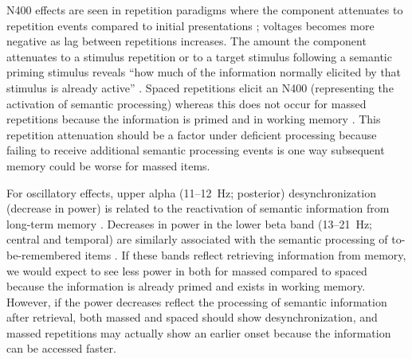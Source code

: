 N400 effects are seen in repetition paradigms where the component attenuates to repetition events compared to initial presentations \cite{KimEtal2001,OlicEtal2000,VanSEtal2007}; voltages becomes more negative as lag between repetitions increases.  The amount the component attenuates to a stimulus repetition or to a target stimulus following a semantic priming stimulus reveals ``how much of the information normally elicited by that stimulus is already active'' \cite[p.~23]{KutaFede2011}.  Spaced repetitions elicit an N400 (representing the activation of semantic processing) whereas this does not occur for massed repetitions because the information is primed and in working memory \cite{VanSEtal2007}.  This repetition attenuation should be a factor under deficient processing because failing to receive additional semantic processing events is one way subsequent memory could be worse for massed items.




For oscillatory effects, upper alpha (11--12~Hz; posterior) desynchronization (decrease in power) is related to the reactivation of semantic information from long-term memory \cite{Klim1999,KlimEtal2005}.  Decreases in power in the lower beta band (13--21~Hz; central and temporal) are similarly associated with the semantic processing of to-be-remembered items \cite{FellEtal2013,HansEtal2012,HansEtal2011a}.  If these bands reflect retrieving information from memory, we would expect to see less power in both for massed compared to spaced because the information is already primed and exists in working memory.  However, if the power decreases reflect the processing of semantic information after retrieval, both massed and spaced should show desynchronization, and massed repetitions may actually show an earlier onset because the information can be accessed faster.



